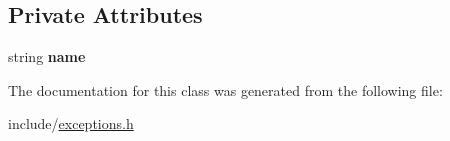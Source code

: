 \subsection*{\-Private \-Attributes}
\begin{DoxyCompactItemize}
\item 
\hypertarget{classcPRExc_a153e6dec3f6fdf2cd4565ecc83a20599}{string {\bfseries name}}\label{d5/d34/classcPRExc_a153e6dec3f6fdf2cd4565ecc83a20599}

\end{DoxyCompactItemize}


\-The documentation for this class was generated from the following file\-:\begin{DoxyCompactItemize}
\item 
include/\hyperlink{exceptions_8h}{exceptions.\-h}\end{DoxyCompactItemize}
